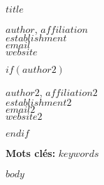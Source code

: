 \documentclass[10pt]{article}
\begin{document}


\renewcommand{\tablename}{\textsc{Tableau}}

\begin{center}
\textsf{\LARGE \textbf{$title$}}
\end{center}

\begin{flushright}
\textsc{$author$, $affiliation$} \\
\textsc{$establishment$} \\
$email$ \\
$website$
\end{flushright}

$if(author2)$
\begin{flushright}
\textsc{$author2$, $affiliation2$} \\
\textsc{$establishment2$} \\
$email2$ \\
$website2$
\end{flushright}
$endif$

\baselineskip


\begin{abstract}

$abstract$

\end{abstract}

\textbf{Mots clés: } $keywords$

\bigskip

$body$


\end{document}
